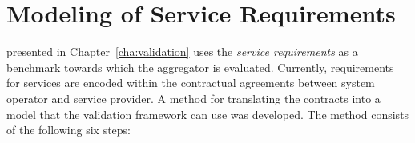\section{Modeling of Service Requirements} %
\label{sec:Modeling of Ancillary Services}
 presented in Chapter~\ref{cha:validation} uses the \emph{service requirements} as a benchmark towards which the aggregator is evaluated. Currently, requirements for services are encoded within the contractual agreements between system operator and service provider. A method for translating the contracts into a model that the validation framework can use was developed.
The method consists of the following six steps:

